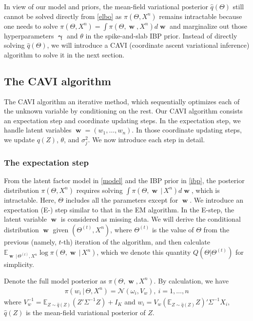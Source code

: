 \documentclass[pdftex]{imsart}
\DeclareMathOperator*{\bw}{\boldsymbol{w}}
\DeclareMathOperator*{\bgamma}{\boldsymbol{\gamma}}
\newcommand{\given}{\,|\,}
\theoremstyle{plain}
\begin{document}
In view of our model and priors, the mean-field variational posterior $\hat q(\Theta)$ still cannot be solved directly from \eqref{elbo} as $\pi(\Theta, X^n)$ remains intractable because one needs to solve $\pi(\Theta, X^n) = \int \pi(\Theta, \bw, X^n) d\bw$ and marginalize out those hyperparameters $\bgamma$ and $\theta$ in the spike-and-slab IBP prior. Instead of directly solving $\hat q(\Theta)$, we will introduce a CAVI (coordinate ascent variational inference) algorithm to solve it in the next section.


\subsection{The CAVI algorithm}
\label{sec:CAVI}
The CAVI algorithm an iterative method, which sequentially optimizes each of the unknown variable by conditioning on the rest. Our CAVI algorithm consists an expectation step and coordinate updating steps. In the expectation step, we handle latent variables $\bw = (w_1, \dots, w_n)$. In those coordinate updating steps, we update $q(Z)$, $\theta$, and $\sigma_j^2$. We now introduce each step in detail. 


\subsubsection{The expectation step}  
From the latent factor model in \eqref{model} and the IBP prior in \eqref{ibp}, the posterior distribution $\pi(\Theta, X^n)$ requires solving $\int \pi(\Theta, \bw \given X^n) d \bw$, which is intractable. Here, $\Theta$ includes all the parameters except for $\bw$.
We introduce an expectation (E-) step similar to that in the EM algorithm. In the E-step, the latent variable $\bw$ is considered as missing data. We will derive the conditional distribution $\bw$ given $(\Theta^{(t)}, X^n)$, where $\Theta^{(t)}$ is the value of $\Theta$ from the previous (namely, $t$-th) iteration of the algorithm,
and then calculate $\mathbb{E}_{\bw \given \Theta^{(t)}, X^n} \log \pi(\Theta, \bw \given X^n)$, which we denote this quantity $Q(\Theta|\Theta^{(t)})$ for simplicity. 


Denote the full model posterior as $\pi(\Theta, \bw, X^n)$. By calculation, we have
\begin{eqnarray}
\label{eqn:cavi-w}
    \pi(w_i \given \Theta, X^n) = \mathcal{N}(\omega_i, V_w), \ i =1, \dots, n%
\end{eqnarray}
where $V_w^{-1} = \mathbb{E}_{Z \sim \hat q(Z)} (Z' \Sigma^{-1} Z) + I_K$ and 
$w_i = V_w (\mathbb{E}_{Z \sim \hat q(Z)} Z)' \Sigma^{-1} X_i$, $\hat q(Z)$ is the mean-field variational posterior of $Z$.
\end{document}
